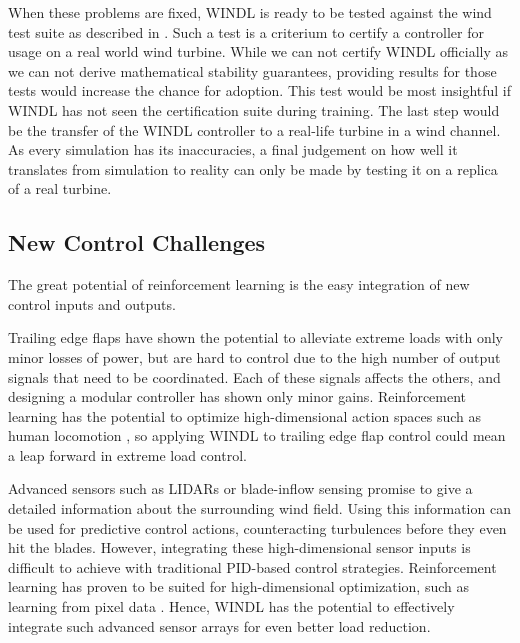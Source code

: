 When these problems are fixed, WINDL is ready to be tested against the wind test suite as described in \cite{internationalelectrotechnicalcommissionIEC61400120192019}. Such a test is a criterium to certify a controller for usage on a real world wind turbine. While we can not certify WINDL officially as we can not derive mathematical stability guarantees, providing results for those tests would increase the chance for adoption. This test would be most insightful if WINDL has not seen the certification suite during training. The last step would be the transfer of the WINDL controller to a real-life turbine in a wind channel. As every simulation has its inaccuracies, a final judgement on how well it translates from simulation to reality can only be made by testing it on a replica of a real turbine.

\subsection{New Control Challenges}

The great potential of reinforcement learning is the easy integration of new control inputs and outputs. 

Trailing edge flaps have shown the potential to alleviate extreme loads with only minor losses of power, but are hard to control \cite{perez-beckerActiveFlapControl2021} due to the high number of output signals that need to be coordinated. Each of these signals affects the others, and designing a modular controller has shown only minor gains. Reinforcement learning has the potential to optimize high-dimensional action spaces such as human locomotion \cite{brockmanOpenAIGym2016}, so applying WINDL to trailing edge flap control could mean a leap forward in extreme load control.

Advanced sensors such as LIDARs \cite{bossanyiWindTurbineControl2014} or blade-inflow sensing \cite{jonesOvercomingFundamentalLimitations2018} promise to give a detailed information about the surrounding wind field. Using this information can be used for predictive control actions, counteracting turbulences before they even hit the blades. However, integrating these high-dimensional sensor inputs is difficult to achieve with traditional PID-based control strategies. Reinforcement learning has proven to be suited for high-dimensional optimization, such as learning from pixel data \cite{mnihPlayingAtariDeep2013}. Hence, WINDL has the potential to effectively integrate such advanced sensor arrays for even better load reduction.

